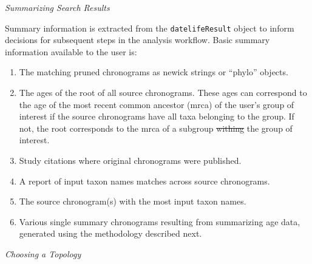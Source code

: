 \documentclass[english,man]{apa6}
\providecommand{\tightlist}{%
  \setlength{\itemsep}{0pt}\setlength{\parskip}{0pt}}
\providecommand{\DIFaddtex}[1]{{\protect\color{blue}\uwave{#1}}} %
\providecommand{\DIFdeltex}[1]{{\protect\color{red}\sout{#1}}}                      %
\providecommand{\DIFaddbegin}{} %
\providecommand{\DIFaddend}{} %
\providecommand{\DIFdelbegin}{} %
\providecommand{\DIFdelend}{} %
\providecommand{\DIFadd}[1]{\texorpdfstring{\DIFaddtex{#1}}{#1}} %
\providecommand{\DIFdel}[1]{\texorpdfstring{\DIFdeltex{#1}}{}} %
\newcommand{\DIFscaledelfig}{0.5}
\newlength{\DIFdelgraphicswidth} %
\newlength{\DIFdelgraphicsheight} %
\newcommand{\DIFaddincludegraphics}[2][]{{\color{blue}\fbox{\DIFOincludegraphics[#1]{#2}}}} %
\newcommand{\DIFdelincludegraphics}[2][]{%
\sbox{\DIFdelgraphicsbox}{\DIFOincludegraphics[#1]{#2}}%
\settoboxwidth{\DIFdelgraphicswidth}{\DIFdelgraphicsbox} %
\settoboxtotalheight{\DIFdelgraphicsheight}{\DIFdelgraphicsbox} %
\scalebox{\DIFscaledelfig}{%
\parbox[b]{\DIFdelgraphicswidth}{\usebox{\DIFdelgraphicsbox}\\[-\baselineskip] \rule{\DIFdelgraphicswidth}{0em}}\llap{\resizebox{\DIFdelgraphicswidth}{\DIFdelgraphicsheight}{%
\setlength{\unitlength}{\DIFdelgraphicswidth}%
\begin{picture}(1,1)%
\thicklines\linethickness{2pt} %
{\color[rgb]{1,0,0}\put(0,0){\framebox(1,1){}}}%
{\color[rgb]{1,0,0}\put(0,0){\line( 1,1){1}}}%
{\color[rgb]{1,0,0}\put(0,1){\line(1,-1){1}}}%
\end{picture}%
}\hspace*{3pt}}} %
} %
\DeclareRobustCommand{\DIFaddbegin}{\DIFOaddbegin \let\includegraphics\DIFaddincludegraphics} %
\DeclareRobustCommand{\DIFaddend}{\DIFOaddend \let\includegraphics\DIFOincludegraphics} %
\DeclareRobustCommand{\DIFdelbegin}{\DIFOdelbegin \let\includegraphics\DIFdelincludegraphics} %
\DeclareRobustCommand{\DIFdelend}{\DIFOaddend \let\includegraphics\DIFOincludegraphics} %
\begin{document}
\begin{center}
\emph{Summarizing Search Results}
\end{center}

Summary information is extracted from the \texttt{datelifeResult} object to inform decisions for subsequent steps in the analysis workflow. Basic summary information available to the user is:

\begin{enumerate}
\def\labelenumi{\arabic{enumi}.}
\tightlist
\item
  The matching pruned chronograms as newick strings or \enquote{phylo} objects.
\item
  The ages of the root of all source chronograms. These ages can correspond to the age of the most recent common ancestor (mrca) of the user's group of interest if the source chronograms have all taxa belonging to the group. If not, the root corresponds to the mrca of a subgroup \DIFdelbegin \DIFdel{withing }\DIFdelend \DIFaddbegin \DIFadd{within }\DIFaddend the group of interest.
\item
  Study citations where original chronograms were published.
\item
  A report of input taxon names matches across source chronograms.
\item
  The source chronogram(s) with the most input taxon names.
\item
  Various single summary chronograms resulting from summarizing age data, generated using the methodology described next.
\end{enumerate}

\begin{center}
\emph{Choosing a Topology}
\end{center}
\end{document}
